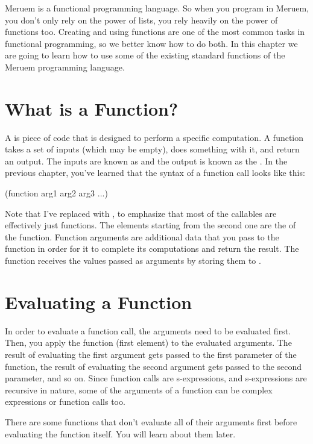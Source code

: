 Meruem is a functional programming language. So when you program in Meruem, you don't only rely on the power of lists, you rely heavily on the power of functions too. Creating and using functions are one of the most common tasks in functional programming, so we better know how to do both. In this chapter we are going to learn how to use some of the existing standard functions of the Meruem programming language.

\section{What is a Function?}
A  is piece of code that is designed to perform a specific computation. A function takes a set of inputs (which may be empty), does something with it, and return an output. The inputs are known as  and the output is known as the . In the previous chapter, you've learned that the syntax of a function call looks like this:

\begin{QuasiLang}
(function arg1 arg2 arg3 ...)
\end{QuasiLang}

Note that I've replaced  with , to emphasize that most of the callables are effectively just functions. The elements starting from the second one are the  of the function. Function arguments are additional data that you pass to the function in order for it to complete its computations and return the result. The function receives the values passed as arguments by storing them to .

\section{Evaluating a Function}
In order to evaluate a function call, the arguments need to be evaluated first. Then, you apply the function (first element) to the evaluated arguments. The result of evaluating the first argument gets passed to the first parameter of the function, the result of evaluating the second argument gets passed to the second parameter, and so on. Since function calls are s-expressions, and s-expressions are recursive in nature, some of the arguments of a function can be complex expressions or function calls too. 

\begin{noteparagraph}
There are some functions that don't evaluate all of their arguments first before evaluating the function itself. You will learn about them later.
\end{noteparagraph}

